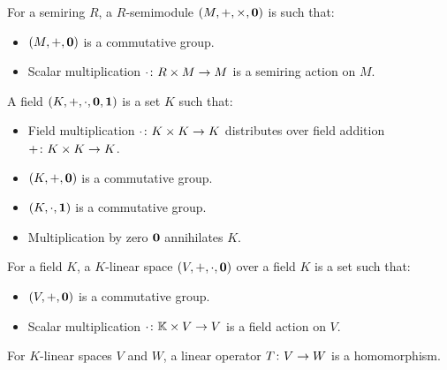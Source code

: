 \documentclass[12pt]{article}
\begin{document}
\begin{definition}[Semimodule]
  For a semiring \(R\), a \(R\)-semimodule
  \(\left(M, +, \times, \mathbf{0}\right)\)
  is such that:
  \begin{itemize}
    \item
      \(\left(M, +, \mathbf{0}\right)\) is a commutative group.

    \item
      Scalar multiplication
      \(\cdot \colon R \times M \to M\) is a semiring action on \(M\).

  \end{itemize}
\end{definition}


\begin{definition}[Field]
  A field \(\left(K, +, \cdot, \mathbf{0}, \mathbf{1}\right)\) is a set \(K\) such that:
  \begin{itemize}
    \item
      Field multiplication \(\cdot \colon K \times K \to K\)
      distributes over field addition \(+ \colon K \times K \to K\).

    \item
      \(\left(K, +, \mathbf{0}\right)\) is a commutative group.

    \item
      \(\left(K, \cdot, \mathbf{1}\right)\) is a commutative group.

    \item
      Multiplication by zero \(\mathbf{0}\) annihilates \(K\).
  \end{itemize}
\end{definition}

\begin{definition}
  For a field \(K\),
  a \(K\)-linear space \(\left(V, +, \cdot, \mathbf{0}\right)\) over a field \(K\)
  is a set such that:
  \begin{itemize}
    \item
      \(\left(V, +, \mathbf{0}\right)\) is a commutative group.

    \item
      Scalar multiplication
      \(\cdot \colon \mathbb{K} \times V \to V\) is a field action on \(V\).

  \end{itemize}
\end{definition}


\begin{definition}
  For \(K\)-linear spaces \(V\) and \(W\), a linear operator
  \(T \colon V \to W\) is a homomorphism.
\end{definition}
\end{document}
